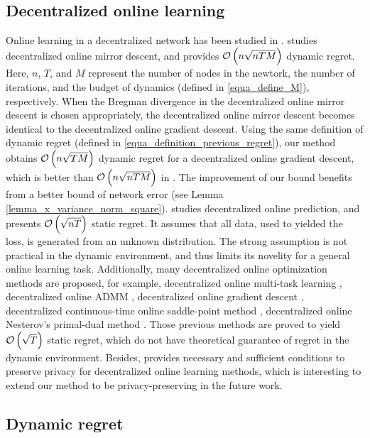 \documentclass{article}
\begin{document}
\subsection{Decentralized online learning}
Online learning in a decentralized network has been studied in \citep{8015179Shahram,Kamp:2014:CDO,Koppel-8352032,Zhang2018,pmlr-v70-zhang17g,Xu2015,tcns-7353155,cdc-7798923,acc-7172037,tcns-7479495,Benczur:2018ww,tkde-6311406}.  \citet{8015179Shahram} studies decentralized online mirror descent, and provides ${\mathcal{O}\left( n\sqrt{nTM} \right)}$ dynamic regret. Here, $n$, $T$, and $M$ represent the number of nodes in the newtork, the number of iterations, and the budget of dynamics (defined in \eqref{equa_define_M}), respectively.  When the Bregman divergence in the decentralized online mirror descent is chosen appropriately, the decentralized online mirror descent becomes identical to the decentralized online gradient descent. Using the same definition of dynamic regret (defined in \eqref{equa_definition_previous_regret}), our method obtains ${\mathcal{O}\left( n\sqrt{TM} \right)}$ dynamic regret for a decentralized online gradient descent, which is better than ${\mathcal{O}\left( n\sqrt{nTM} \right)}$ in \citet{8015179Shahram}. The improvement of our bound benefits from a better bound of network error (see Lemma \ref{lemma_x_variance_norm_square}). \citet{Kamp:2014:CDO} studies decentralized online prediction, and presents ${\mathcal{O}\left( \sqrt{nT} \right)}$ static regret.  It assumes that all data, used to yielded the loss, is generated from an unknown distribution. The strong assumption is not practical in the dynamic environment, and thus limits its novelity for a general online learning task. 
Additionally, many decentralized online optimization methods are proposed, for example, decentralized online multi-task learning \citep{Zhang2018}, decentralized online ADMM \citep{Xu2015}, decentralized online gradient descent \citep{tcns-7353155}, decentralized continuous-time online saddle-point method \citep{cdc-7798923}, decentralized online  Nesterov's primal-dual method \citep{acc-7172037,tcns-7479495}. Those previous methods are proved to yield ${\mathcal{O}\left( \sqrt{T} \right)}$ static regret, which do not have theoretical guarantee of regret in the dynamic environment.   Besides,  \citet{tkde-6311406} provides necessary and sufficient conditions to preserve privacy for decentralized online learning methods, which  is interesting to extend our method to be privacy-preserving in the future work.


\subsection{Dynamic regret}
\end{document}
